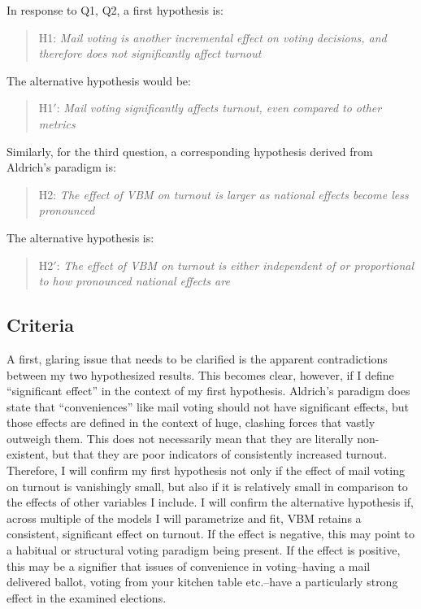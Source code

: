 \documentclass[12pt,twoside]{reedthesis}
\begin{document}
  In response to Q1, Q2, a first hypothesis is:
  
  \begin{quotation}  
  H1: \textit{Mail voting is another incremental effect on voting decisions, and therefore
  does not significantly affect turnout}
  \end{quotation}
  
  The alternative hypothesis would be:
  
  \begin{quotation}  
  H1$'$: \textit{Mail  voting  significantly  affects  turnout,  even  compared  to  other  metrics}
  \end{quotation}
  
  Similarly, for the third question, a corresponding hypothesis derived
  from Aldrich's paradigm is:
  
  \begin{quotation}  
  H2: \textit{The  effect  of  VBM  on  turnout  is  larger  as  national  effects  become less pronounced}
  \end{quotation}
  
  The alternative hypothesis is:
  
  \begin{quotation}  
  H2$'$: \textit{The  effect  of  VBM  on  turnout  is either independent of or proportional to how pronounced national effects are}
  \end{quotation}
  
  \subsection{Criteria}\label{criteria}
  
  A first, glaring issue that needs to be clarified is the apparent
  contradictions between my two hypothesized results. This becomes clear,
  however, if I define ``significant effect'' in the context of my first
  hypothesis. Aldrich's paradigm does state that ``conveniences'' like
  mail voting should not have significant effects, but those effects are
  defined in the context of huge, clashing forces that vastly outweigh
  them. This does not necessarily mean that they are literally
  non-existent, but that they are poor indicators of consistently
  increased turnout. Therefore, I will confirm my first hypothesis not
  only if the effect of mail voting on turnout is vanishingly small, but
  also if it is relatively small in comparison to the effects of other
  variables I include. I will confirm the alternative hypothesis if,
  across multiple of the models I will parametrize and fit, VBM retains a
  consistent, significant effect on turnout. If the effect is negative,
  this may point to a habitual or structural voting paradigm being
  present. If the effect is positive, this may be a signifier that issues
  of convenience in voting--having a mail delivered ballot, voting from
  your kitchen table etc.--have a particularly strong effect in the
  examined elections.
  
\end{document}
